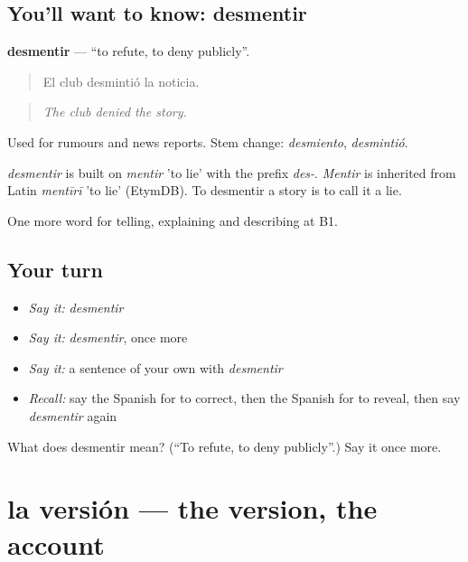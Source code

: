 \subsection*{You'll want to know: desmentir}
\textbf{desmentir} — \textquotedblleft{}to refute, to deny publicly\textquotedblright{}.

\begin{quote}
El club desmintió la noticia.
\end{quote}

\begin{quote}
\emph{The club denied the story.}
\end{quote}

Used for rumours and news reports. Stem change: \emph{desmiento}, \emph{desmintió}.

\begin{cousinweb}
\emph{desmentir} is built on \emph{mentir} 'to lie' with the prefix \emph{des-}. \emph{Mentir} is inherited from Latin \emph{mentīrī} 'to lie' (EtymDB). To desmentir a story is to call it a lie.
\end{cousinweb}

\begin{grammarlens}[title={What you've built}]
One more word for telling, explaining and describing at B1.
\end{grammarlens}

\subsection*{Your turn}
\begin{itemize}
\raggedright
  \item \emph{Say it:} \emph{desmentir}
  \item \emph{Say it:} \emph{desmentir}, once more
  \item \emph{Say it:} a sentence of your own with \emph{desmentir}
  \item \emph{Recall:} say the Spanish for to correct, then the Spanish for to reveal, then say \emph{desmentir} again
\end{itemize}

\begin{tcolorbox}[breakable,colback=teal!4,colframe=teal!35!black,title={Before you move on}]
What does desmentir mean? (\textquotedblleft{}To refute, to deny publicly\textquotedblright{}.) Say it once more.
\end{tcolorbox}
\section[la versión]{la versión — the version, the account}


